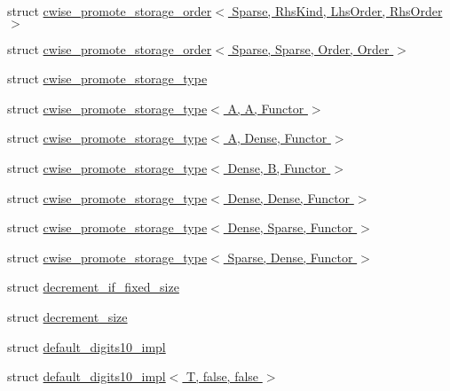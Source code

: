 \begin{DoxyCompactItemize}
\item 
struct \hyperlink{struct_eigen_1_1internal_1_1cwise__promote__storage__order_3_01_sparse_00_01_rhs_kind_00_01_lhs_order_00_01_rhs_order_01_4}{cwise\+\_\+promote\+\_\+storage\+\_\+order$<$ Sparse, Rhs\+Kind, Lhs\+Order, Rhs\+Order $>$}
\item 
struct \hyperlink{struct_eigen_1_1internal_1_1cwise__promote__storage__order_3_01_sparse_00_01_sparse_00_01_order_00_01_order_01_4}{cwise\+\_\+promote\+\_\+storage\+\_\+order$<$ Sparse, Sparse, Order, Order $>$}
\item 
struct \hyperlink{struct_eigen_1_1internal_1_1cwise__promote__storage__type}{cwise\+\_\+promote\+\_\+storage\+\_\+type}
\item 
struct \hyperlink{struct_eigen_1_1internal_1_1cwise__promote__storage__type_3_01_a_00_01_a_00_01_functor_01_4}{cwise\+\_\+promote\+\_\+storage\+\_\+type$<$ A, A, Functor $>$}
\item 
struct \hyperlink{struct_eigen_1_1internal_1_1cwise__promote__storage__type_3_01_a_00_01_dense_00_01_functor_01_4}{cwise\+\_\+promote\+\_\+storage\+\_\+type$<$ A, Dense, Functor $>$}
\item 
struct \hyperlink{struct_eigen_1_1internal_1_1cwise__promote__storage__type_3_01_dense_00_01_b_00_01_functor_01_4}{cwise\+\_\+promote\+\_\+storage\+\_\+type$<$ Dense, B, Functor $>$}
\item 
struct \hyperlink{struct_eigen_1_1internal_1_1cwise__promote__storage__type_3_01_dense_00_01_dense_00_01_functor_01_4}{cwise\+\_\+promote\+\_\+storage\+\_\+type$<$ Dense, Dense, Functor $>$}
\item 
struct \hyperlink{struct_eigen_1_1internal_1_1cwise__promote__storage__type_3_01_dense_00_01_sparse_00_01_functor_01_4}{cwise\+\_\+promote\+\_\+storage\+\_\+type$<$ Dense, Sparse, Functor $>$}
\item 
struct \hyperlink{struct_eigen_1_1internal_1_1cwise__promote__storage__type_3_01_sparse_00_01_dense_00_01_functor_01_4}{cwise\+\_\+promote\+\_\+storage\+\_\+type$<$ Sparse, Dense, Functor $>$}
\item 
struct \hyperlink{struct_eigen_1_1internal_1_1decrement__if__fixed__size}{decrement\+\_\+if\+\_\+fixed\+\_\+size}
\item 
struct \hyperlink{struct_eigen_1_1internal_1_1decrement__size}{decrement\+\_\+size}
\item 
struct \hyperlink{struct_eigen_1_1internal_1_1default__digits10__impl}{default\+\_\+digits10\+\_\+impl}
\item 
struct \hyperlink{struct_eigen_1_1internal_1_1default__digits10__impl_3_01_t_00_01false_00_01false_01_4}{default\+\_\+digits10\+\_\+impl$<$ T, false, false $>$}

\end{DoxyCompactItemize}
